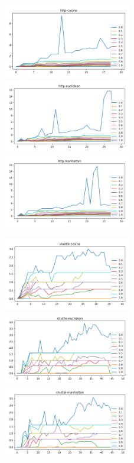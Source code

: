 \begin{figure}[!t]
\centering

\includegraphics[width=2.2in]{kdd/static/lfd_vs_depth/http-cosine.png}
\includegraphics[width=2.2in]{kdd/static/lfd_vs_depth/http-euclidean.png}
\includegraphics[width=2.2in]{kdd/static/lfd_vs_depth/http-manhattan.png}

\includegraphics[width=2.2in]{kdd/static/lfd_vs_depth/shuttle-cosine.png}
\includegraphics[width=2.2in]{kdd/static/lfd_vs_depth/shuttle-euclidean.png}
\includegraphics[width=2.2in]{kdd/static/lfd_vs_depth/shuttle-manhattan.png}


\end{figure}
